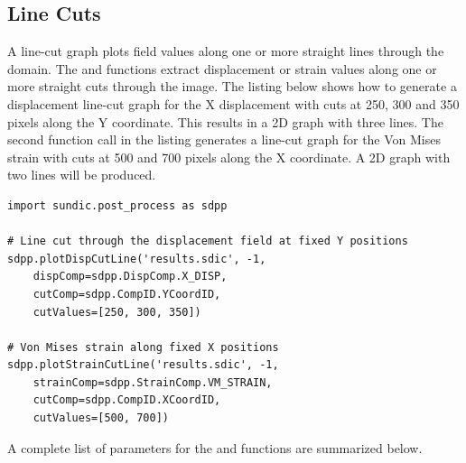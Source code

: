 \subsection{Line Cuts}

A line-cut graph plots field values along one or more straight lines through the domain. The  and  functions extract displacement or strain values along one or more straight cuts through the image.  The listing below shows how to generate a displacement line-cut graph for the X  displacement with cuts at 250, 300 and 350 pixels along the Y coordinate.  This results in a 2D graph with three lines.  The second function call in the listing generates a line-cut graph for the Von Mises strain with cuts at 500 and 700 pixels along the X coordinate. A 2D graph with two lines will be produced.

\newpage
\begin{lstlisting}
import sundic.post_process as sdpp

# Line cut through the displacement field at fixed Y positions
sdpp.plotDispCutLine('results.sdic', -1,
	dispComp=sdpp.DispComp.X_DISP,
	cutComp=sdpp.CompID.YCoordID,
	cutValues=[250, 300, 350])
	
# Von Mises strain along fixed X positions
sdpp.plotStrainCutLine('results.sdic', -1,
	strainComp=sdpp.StrainComp.VM_STRAIN,
	cutComp=sdpp.CompID.XCoordID,
	cutValues=[500, 700])
\end{lstlisting}

A complete list of parameters for the   and  functions are summarized below.

